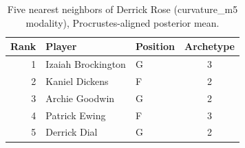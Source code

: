 \begin{table}[htbp]
  \centering\small
  \begin{tabular}{rllc}
    \toprule
    Rank & Player & Position & Archetype \\
    \midrule
    1 & Izaiah Brockington & G & 3 \\
    2 & Kaniel Dickens & F & 2 \\
    3 & Archie Goodwin & G & 2 \\
    4 & Patrick Ewing & F & 3 \\
    5 & Derrick Dial & G & 2 \\
    \bottomrule
  \end{tabular}
  \caption{Five nearest neighbors of Derrick Rose (curvature_m5 modality), Procrustes-aligned posterior mean.}
  \label{tab:Derrick_Rose_neighbors_curvature_m5}
\end{table}

